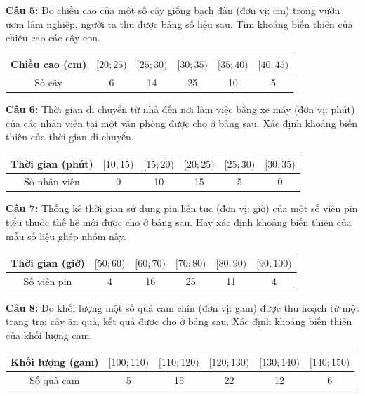 \documentclass[12pt]{article}
\begin{document}
	\noindent \textbf{Câu 5:} Đo chiều cao của một số cây giống bạch đàn (đơn vị: cm) trong vườn ươm lâm nghiệp, người ta thu được bảng số liệu sau. Tìm khoảng biến thiên của chiều cao các cây con.
	\begin{center}
		\renewcommand{\arraystretch}{1.3}
		\begin{tabular}{|c|c|c|c|c|c|}
			\hline
			Chiều cao (cm) & $[20; 25)$ & $[25; 30)$ & $[30; 35)$ & $[35; 40)$ & $[40; 45)$ \\
			\hline
			Số cây & 6 & 14 & 25 & 10 & 5 \\
			\hline
		\end{tabular}
	\end{center}
	
	\vspace{4mm}
	
	\noindent \textbf{Câu 6:} Thời gian di chuyển từ nhà đến nơi làm việc bằng xe máy (đơn vị: phút) của các nhân viên tại một văn phòng được cho ở bảng sau. Xác định khoảng biến thiên của thời gian di chuyển.
	\begin{center}
		\renewcommand{\arraystretch}{1.3}
		\begin{tabular}{|c|c|c|c|c|c|}
			\hline
			Thời gian (phút) & $[10; 15)$ & $[15; 20)$ & $[20; 25)$ & $[25; 30)$ & $[30; 35)$ \\
			\hline
			Số nhân viên & 0 & 10 & 15 & 5 & 0 \\
			\hline
		\end{tabular}
	\end{center}
	
	\vspace{4mm}
	
	\noindent \textbf{Câu 7:} Thống kê thời gian sử dụng pin liên tục (đơn vị: giờ) của một số viên pin tiểu thuộc thế hệ mới được cho ở bảng sau. Hãy xác định khoảng biến thiên của mẫu số liệu ghép nhóm này.
	\begin{center}
		\renewcommand{\arraystretch}{1.3}
		\begin{tabular}{|c|c|c|c|c|c|}
			\hline
			Thời gian (giờ) & $[50; 60)$ & $[60; 70)$ & $[70; 80)$ & $[80; 90)$ & $[90; 100)$ \\
			\hline
			Số viên pin & 4 & 16 & 25 & 11 & 4 \\
			\hline
		\end{tabular}
	\end{center}
	
	\vspace{4mm}
	
	\noindent \textbf{Câu 8:} Đo khối lượng một số quả cam chín (đơn vị: gam) được thu hoạch từ một trang trại cây ăn quả, kết quả được cho ở bảng sau. Xác định khoảng biến thiên của khối lượng cam.
	\begin{center}
		\renewcommand{\arraystretch}{1.3}
		\begin{tabular}{|c|c|c|c|c|c|}
			\hline
			Khối lượng (gam) & $[100; 110)$ & $[110; 120)$ & $[120; 130)$ & $[130; 140)$ & $[140; 150)$ \\
			\hline
			Số quả cam & 5 & 15 & 22 & 12 & 6 \\
			\hline
		\end{tabular}
	\end{center}
	
\end{document}
